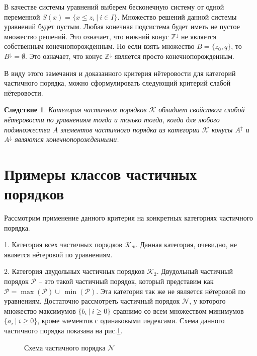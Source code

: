\documentclass[12pt]{article}
\theoremstyle{break}
\newtheorem{Con}{Следствие}
\def\P{\mathcal{P}}
\begin{document}
		В качестве системы уравнений выберем бесконечную систему от одной переменной $S(x) = \{x\leqslant z_i\ |\ i\in I\}.$ Множество решений данной системы уравнений будет пустым. Любая конечная подсистема будет иметь не пустое множество решений. Это означает, что нижний конус $\mathbb{Z}^{\downarrow}$ не является собственным конечнопорожденным. Но если взять множество $B = \{z_0, q\}$, то $B^{\downarrow} = \emptyset$. Это означает, что конус $\mathbb{Z}^{\downarrow}$ является просто конечнопорожденным.

		В виду этого замечания и доказанного критерия нётеровости для категорий частичного порядка, можно сформулировать следующий критерий слабой нётеровости.

		\begin{Con}
			Категория частичных порядков $\mathcal{K}$ обладает свойством слабой нётеровости по уравнениям тогда и только тогда, когда для любого подмножества $A$ элементов частичного порядка из категории $\mathcal{K}$ конусы $A^{\uparrow}$ и $A^{\downarrow}$ являются конечнопорожденными.
		\end{Con}


	\section{Примеры классов частичных порядков}
		Рассмотрим применение данного критерия на конкретных категориях частичного порядка.

		1. Категория всех частичных порядков $\mathcal{K}_{\P}.$ Данная категория, очевидно, не является нётеровой по уравнениям.

		2. Категория двудольных частичных порядков $\mathcal{K}_2$. Двудольный частичный порядок $\P$ -- это такой частичный порядок, который представим как $\P = \max(\P)\cup~\min(\P)$. Эта категория так же не является нётеровой по уравнениям. Достаточно рассмотреть частичный порядок $\mathcal{N}$, у которого множество максимумов $\{b_i\ |\ i\geqslant 0\}$ сравнимо со всем множеством минимумов $\{a_i\ |\ i\geqslant 0\}$, кроме элементов с одинаковыми индексами. Схема данного частичного порядка показана на рис.\ref{bipartPoset}.

		\begin{figure}[h]
			\begin{center}
				\caption{Схема частичного порядка $\mathcal{N}$}
				\label{bipartPoset}
			\end{center}
		\end{figure}
\end{document}
